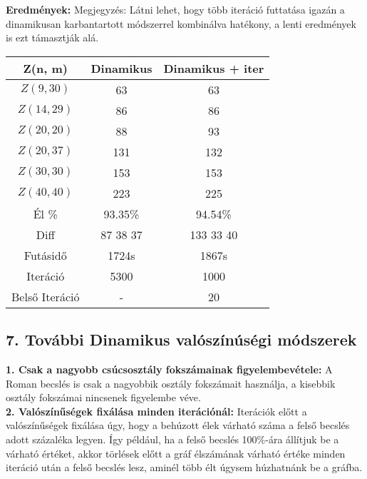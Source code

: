 \documentclass[12pt,a4paper]{article}
\begin{document}
\textbf{Eredmények:}
Megjegyzés: Látni lehet, hogy több iteráció futtatása igazán a dinamikusan karbantartott módszerrel kombinálva hatékony, a lenti eredmények is ezt támasztják alá.
\begin{table}[H]
\centering
\begin{tabular}{|c|c|c|}
\hline
\textbf{Z(n, m)} & \textbf{Dinamikus} & \textbf{Dinamikus + iter} \\
\hline
$Z(9,30)$  & 63 & 63 \\
$Z(14, 29)$ & 86 & 86 \\
$Z(20, 20)$ & 88 & 93 \\
$Z(20, 37)$ & 131 & 132 \\
$Z(30, 30)$ & 153 & 153 \\
$Z(40, 40)$ & 223 & 225 \\
\hline
Él \% & 93.35\% & 94.54\% \\
\hline
Diff & 87 38 37 & 133 33 40 \\
\hline
Futásidő & 1724s & 1867s \\
Iteráció & 5300 & 1000 \\
Belső Iteráció & - & 20 \\
\hline
\end{tabular}
\end{table}

\subsection*{7. További Dinamikus valószínúségi módszerek}

\textbf{1. Csak a nagyobb csúcsosztály fokszámainak figyelembevétele:} A Roman becslés is csak a nagyobbik osztály fokszámait használja, a kisebbik osztály fokszámai nincsenek figyelembe véve.\\
\textbf{2. Valószínűségek fixálása minden iterációnál:} Iterációk előtt a valószínűségek fixálása úgy, hogy a behúzott élek várható száma a felső becslés adott százaléka legyen. Így például, ha a felső becslés 100\%-ára állítjuk be a várható értéket, akkor törlések előtt a gráf élszámának várható értéke minden iteráció után a felső becslés lesz, aminél több élt úgysem húzhatnánk be a gráfba.
\end{document}
